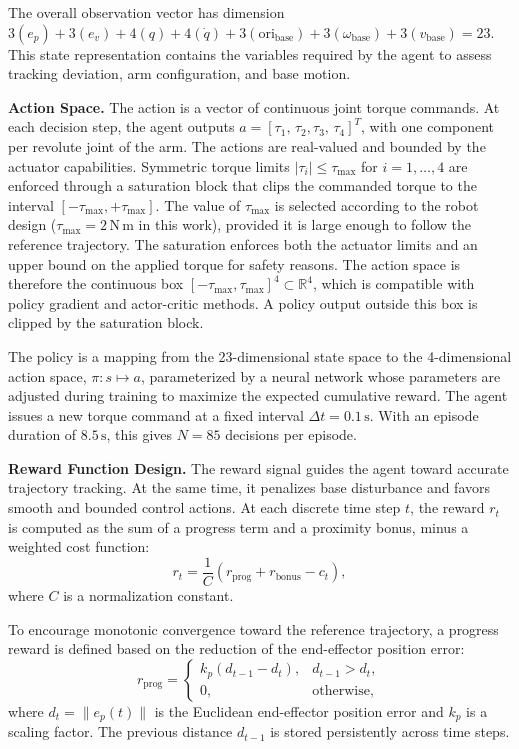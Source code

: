 \documentclass{ieeeaccess}
\begin{document}
The overall observation vector has dimension
$3(e_p) + 3(e_v) + 4(q) + 4(\dot{q}) + 3(\mathrm{ori}_{\mathrm{base}}) + 3(\omega_{\mathrm{base}}) + 3(v_{\mathrm{base}}) = 23$.
This state representation contains the variables required by the agent to assess tracking deviation, arm
configuration, and base motion.

\textbf{Action Space.} The action is a vector of continuous joint torque commands. At each decision step,
the agent outputs $a = [\tau_{1},\, \tau_{2}, \tau_{3},\, \tau_{4}]^T$, with one component per revolute
joint of the arm. The actions are real-valued and bounded by the actuator capabilities.
Symmetric torque limits $|\tau_{i}| \leq \tau_{\max}$ for $i = 1,\ldots,4$ are enforced through
a saturation block that clips the commanded torque to the interval
$[-\tau_{\max}, +\tau_{\max}]$. The value of $\tau_{\max}$ is selected according to the robot design
($\tau_{\max} = 2\,\mathrm{N\,m}$ in this work), provided it is large enough to follow the
reference trajectory. The saturation enforces both the actuator limits and an upper bound on the applied
torque for safety reasons. The action space is therefore the continuous box
$[-\tau_{\max}, \tau_{\max}]^4 \subset \mathbb{R}^4$, which is compatible with policy gradient and
actor-critic methods. A policy output outside this box is clipped by the saturation block.

The policy is a mapping from the 23-dimensional state space to the 4-dimensional action space,
$\pi: s \mapsto a$, parameterized by a neural network whose parameters are adjusted during training to
maximize the expected cumulative reward. The agent issues a new torque command at a fixed interval
$\Delta t = 0.1\,\mathrm{s}$. With an episode duration of $8.5\,\mathrm{s}$, this gives
$N = 85$ decisions per episode.


\textbf{Reward Function Design.} The reward signal guides the agent toward accurate trajectory tracking. At the
same time, it penalizes base disturbance and favors smooth and bounded control actions.
At each discrete time step $t$, the reward $r_t$ is computed as the sum
of a progress term and a proximity bonus, minus a weighted cost function:
\begin{equation}
r_t = \frac{1}{C}\left( r_{\mathrm{prog}} + r_{\mathrm{bonus}} - c_t \right),
\label{eq:reward}
\end{equation}
where $C$ is a normalization constant.

To encourage monotonic convergence toward the reference trajectory, a progress reward is defined based
on the reduction of the end-effector position error:
\begin{equation}
r_{\mathrm{prog}} = 
\begin{cases}
k_p \left( d_{t-1} - d_t \right), & d_{t-1} > d_t,\\
0, & \text{otherwise},
\end{cases}
\end{equation}
where $d_t = \|e_p(t)\|$ is the Euclidean end-effector position error and $k_p$ is a
scaling factor. The previous distance $d_{t-1}$ is stored persistently across time steps.
\end{document}
